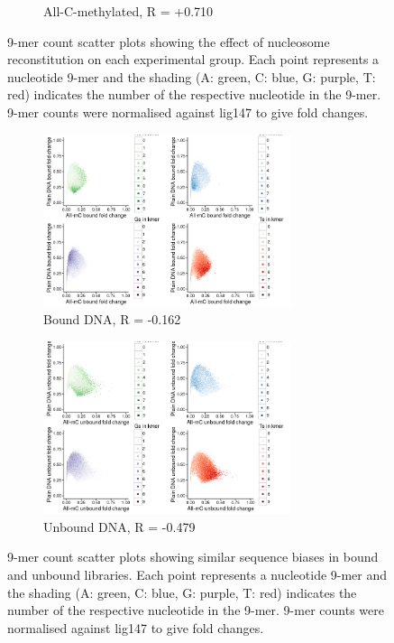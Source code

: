 \documentclass[a4paper, numbers=noenddot]{scrbook}
\begin{document}
\begin{figure}[htbp]
\begin{subfigure}[htbp]{0.8\textwidth}
    \caption{All-C-methylated, R = +0.710}
    \label{fig:kmer_bound_all}
  \end{subfigure}
  \caption{9-mer count scatter plots showing the effect of nucleosome reconstitution on each experimental group.  Each point represents a nucleotide 9-mer and the shading (A: green, C: blue, G: purple, T: red) indicates the number of the respective nucleotide in the 9-mer.  9-mer counts were normalised against lig147 to give fold changes.}
  \label{fig:kmer_bound}
\end{figure}

\begin{figure}[htbp]
  \centering
  \begin{subfigure}[htbp]{0.8\textwidth}
    \centering
    \includegraphics[width=0.8\textwidth]{kmer_plainbXallb}
    \caption{Bound DNA, R = -0.162}
    \label{fig:kmer_bias_bound}
  \end{subfigure}
  \begin{subfigure}[htbp]{0.8\textwidth}
    \centering
    \includegraphics[width=0.8\textwidth]{kmer_plainubXallub}
    \caption{Unbound DNA, R = -0.479}
    \label{fig:kmer_bias_unbound}
  \end{subfigure}
  \caption{9-mer count scatter plots showing similar sequence biases in bound and unbound libraries.  Each point represents a nucleotide 9-mer and the shading (A: green, C: blue, G: purple, T: red) indicates the number of the respective nucleotide in the 9-mer.  9-mer counts were normalised against lig147 to give fold changes.}
  \label{fig:kmer_bias}
\end{figure}
\end{document}
